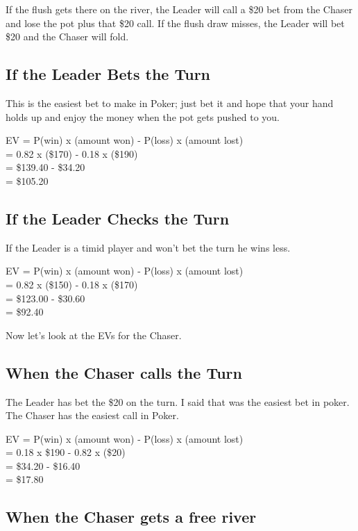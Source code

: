 If the flush gets there on the river, the Leader will call a \$20 bet
from the Chaser and lose the pot plus that \$20 call. If the flush draw
misses, the Leader will bet \$20 and the Chaser will fold.

\subsection{If the Leader Bets the Turn}

This is the easiest bet to make in Poker; just bet it and hope that
your hand holds up and enjoy the money when the pot gets pushed to
you.

EV = P(win) x (amount won) - P(loss) x (amount lost) \\
   = 0.82   x (\$170)      - 0.18    x (\$190) \\
   = \$139.40 - \$34.20 \\
   = \$105.20

\subsection{If the Leader Checks the Turn}

If the Leader is a timid player and won't bet the turn
he wins less.

EV = P(win) x (amount won) - P(loss) x (amount lost) \\
   = 0.82   x (\$150)      - 0.18    x (\$170) \\
   = \$123.00 - \$30.60 \\
   = \$92.40

Now let's look at the EVs for the Chaser.

\subsection{When the Chaser calls the Turn}

The Leader has bet the \$20 on the turn. I said that was the easiest
bet in poker. The Chaser has the easiest call in Poker.

EV = P(win) x (amount won) - P(loss) x (amount lost) \\
   = 0.18 x \$190 - 0.82 x (\$20) \\
   = \$34.20 - \$16.40 \\
   = \$17.80

\subsection{When the Chaser gets a free river}

